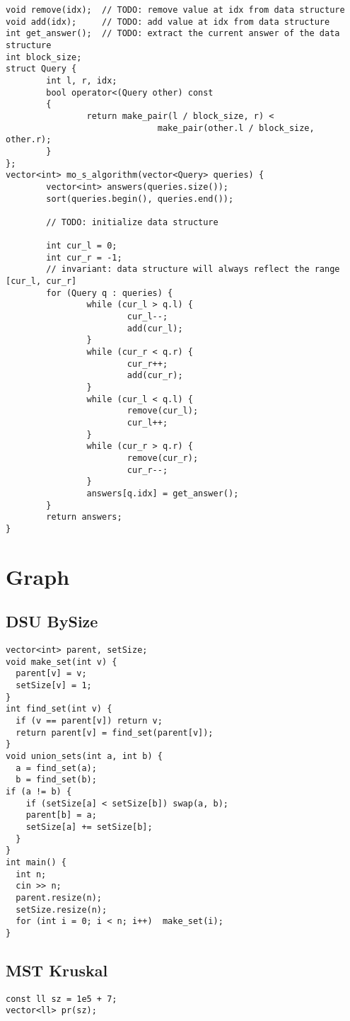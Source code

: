 \documentclass[FSZ,a4paper,onesided]{article}
\begin{document}
\begin{multicols*}{\COLS}
\begin{lstlisting}
void remove(idx);  // TODO: remove value at idx from data structure
void add(idx);     // TODO: add value at idx from data structure
int get_answer();  // TODO: extract the current answer of the data structure
int block_size;
struct Query {
        int l, r, idx;
        bool operator<(Query other) const
        {
                return make_pair(l / block_size, r) <
                              make_pair(other.l / block_size, other.r);
        }
};
vector<int> mo_s_algorithm(vector<Query> queries) {
        vector<int> answers(queries.size());
        sort(queries.begin(), queries.end());

        // TODO: initialize data structure

        int cur_l = 0;
        int cur_r = -1;
        // invariant: data structure will always reflect the range [cur_l, cur_r]
        for (Query q : queries) {
                while (cur_l > q.l) {
                        cur_l--;
                        add(cur_l);
                }
                while (cur_r < q.r) {
                        cur_r++;
                        add(cur_r);
                }
                while (cur_l < q.l) {
                        remove(cur_l);
                        cur_l++;
                }
                while (cur_r > q.r) {
                        remove(cur_r);
                        cur_r--;
                }
                answers[q.idx] = get_answer();
        }
        return answers;
}\end{lstlisting}
\section{Graph}
\subsection{DSU BySize}
\begin{lstlisting}
vector<int> parent, setSize;
void make_set(int v) {
  parent[v] = v;
  setSize[v] = 1;
}
int find_set(int v) {
  if (v == parent[v]) return v;
  return parent[v] = find_set(parent[v]);
}
void union_sets(int a, int b) {
  a = find_set(a);
  b = find_set(b);
if (a != b) {
    if (setSize[a] < setSize[b]) swap(a, b);
    parent[b] = a;
    setSize[a] += setSize[b];
  }
}
int main() {
  int n;
  cin >> n;
  parent.resize(n);
  setSize.resize(n);
  for (int i = 0; i < n; i++)  make_set(i);
}\end{lstlisting}
\subsection{MST Kruskal}
\begin{lstlisting}
const ll sz = 1e5 + 7;
vector<ll> pr(sz);


\end{lstlisting}
\end{multicols*}
\end{document}
